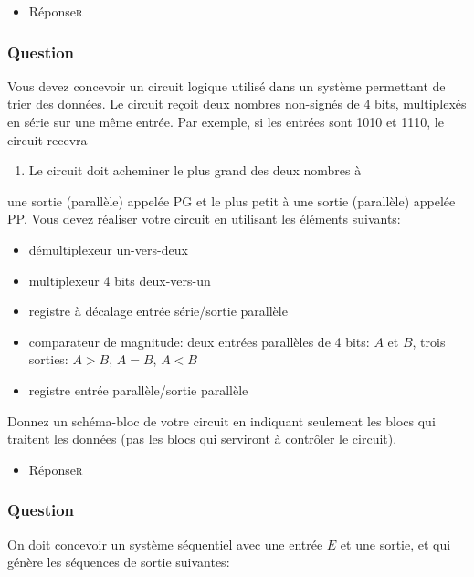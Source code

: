 \documentclass[11pt]{article}
\begin{document}
\begin{itemize}
\item Réponse\hfill{}\textsc{r}
\label{sec:orgfffc767}
\end{itemize}

\subsubsection*{Question}
\label{sec:orgc543210}
Vous devez concevoir un circuit logique utilisé dans un système
permettant de trier des données. Le circuit reçoit deux nombres
non-signés de 4 bits, multiplexés en série sur une même entrée. Par
exemple, si les entrées sont 1010 et 1110, le circuit recevra
\begin{enumerate}
\item Le circuit doit acheminer le plus grand des deux nombres à
\end{enumerate}
une sortie (parallèle) appelée PG et le plus petit à une sortie
(parallèle) appelée PP. Vous devez réaliser votre circuit en utilisant
les éléments suivants:

\begin{itemize}
\item démultiplexeur un-vers-deux

\item multiplexeur 4 bits deux-vers-un

\item registre à décalage entrée série/sortie parallèle

\item comparateur de magnitude: deux entrées parallèles de 4 bits: \(A\) et
\(B\), trois sorties: \(A>B\), \(A=B\), \(A<B\)

\item registre entrée parallèle/sortie parallèle
\end{itemize}

Donnez un schéma-bloc de votre circuit en indiquant seulement les
blocs qui traitent les données (pas les blocs qui serviront à contrôler
le circuit).

\begin{itemize}
\item Réponse\hfill{}\textsc{r}
\label{sec:org026cece}
\end{itemize}

\subsubsection*{Question}
\label{sec:orgb117646}
On doit concevoir un système séquentiel avec une entrée \(E\) et une
sortie, et qui génère les séquences de sortie suivantes:
\end{document}
